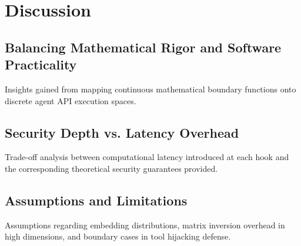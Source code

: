 \chapter{Discussion}
\label{ch:discussion}

\section{Balancing Mathematical Rigor and Software Practicality}
Insights gained from mapping continuous mathematical boundary functions onto discrete agent API execution spaces.

\section{Security Depth vs. Latency Overhead}
Trade-off analysis between computational latency introduced at each hook and the corresponding theoretical security guarantees provided.

\section{Assumptions and Limitations}
Assumptions regarding embedding distributions, matrix inversion overhead in high dimensions, and boundary cases in tool hijacking defense.
